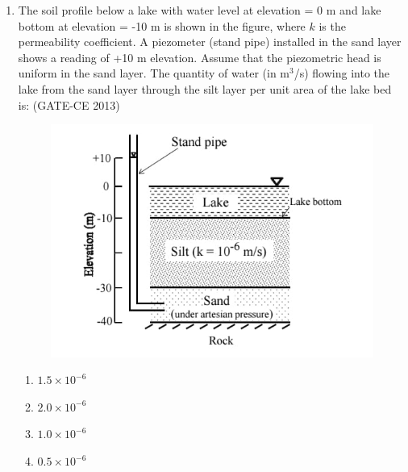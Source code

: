 \documentclass[journal,12pt,onecolumn]{article}
\theoremstyle{remark}
\begin{document}
\begin{enumerate}
    \item The soil profile below a lake with water level at elevation = 0 m and lake bottom at elevation = -10 m is shown in the figure, where $k$ is the permeability coefficient. A piezometer (stand pipe) installed in the sand layer shows a reading of +10 m elevation. Assume that the piezometric head is uniform in the sand layer. The quantity of water (in m$^3$/s) flowing into the lake from the sand layer through the silt layer per unit area of the lake bed is: (GATE-CE 2013)
    \begin{figure}[H]
    \centering
    \includegraphics[width=0.7\columnwidth]{figs/image36.jpg}  
    \caption{}
    \label{fig:6}
    \end{figure}
    \begin{multicols}{4}
    \begin{enumerate}
        \item $1.5 \times 10^{-6}$ 
        \item $2.0 \times 10^{-6}$ 
        \item $1.0 \times 10^{-6}$ 
        \item $0.5 \times 10^{-6}$
    \end{enumerate}
    \end{multicols}
    

\end{enumerate}
\end{document}
